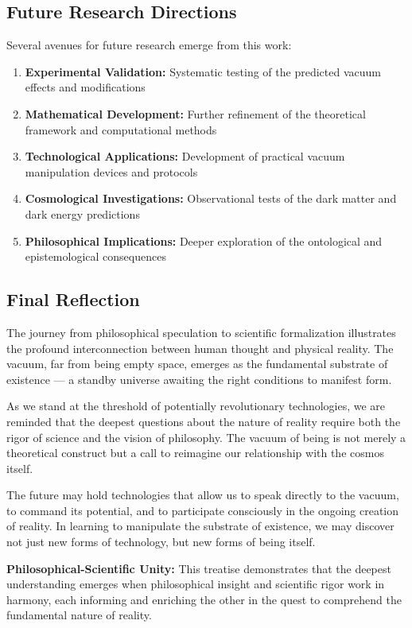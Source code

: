 \documentclass[12pt,a4paper]{article}
\begin{document}
\subsection{Future Research Directions}

Several avenues for future research emerge from this work:

\begin{enumerate}
    \item \textbf{Experimental Validation:} Systematic testing of the predicted vacuum effects and modifications
    \item \textbf{Mathematical Development:} Further refinement of the theoretical framework and computational methods
    \item \textbf{Technological Applications:} Development of practical vacuum manipulation devices and protocols
    \item \textbf{Cosmological Investigations:} Observational tests of the dark matter and dark energy predictions
    \item \textbf{Philosophical Implications:} Deeper exploration of the ontological and epistemological consequences
\end{enumerate}

\subsection{Final Reflection}

The journey from philosophical speculation to scientific formalization illustrates the profound interconnection between human thought and physical reality. The vacuum, far from being empty space, emerges as the fundamental substrate of existence — a standby universe awaiting the right conditions to manifest form.

As we stand at the threshold of potentially revolutionary technologies, we are reminded that the deepest questions about the nature of reality require both the rigor of science and the vision of philosophy. The vacuum of being is not merely a theoretical construct but a call to reimagine our relationship with the cosmos itself.

The future may hold technologies that allow us to speak directly to the vacuum, to command its potential, and to participate consciously in the ongoing creation of reality. In learning to manipulate the substrate of existence, we may discover not just new forms of technology, but new forms of being itself.

\begin{bridgebox}
\textbf{Philosophical-Scientific Unity:} This treatise demonstrates that the deepest understanding emerges when philosophical insight and scientific rigor work in harmony, each informing and enriching the other in the quest to comprehend the fundamental nature of reality.
\end{bridgebox}
\end{document}

